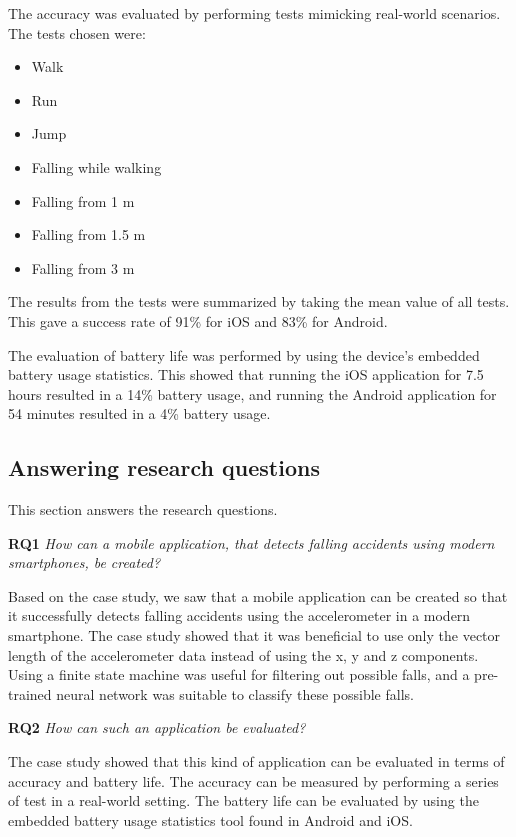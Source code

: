 \documentclass[12pt, a4paper, onecolumn]{article}
\begin{document}
	The accuracy was evaluated by performing tests mimicking real-world scenarios. The tests chosen were:
	
	\begin{itemize}
		\item Walk
		\item Run
		\item Jump
		\item Falling while walking
		\item Falling from 1 m
		\item Falling from 1.5 m
		\item Falling from 3 m
	\end{itemize}
	
	The results from the tests were summarized by taking the mean value of all tests. This gave a success rate of 91\% for iOS and 83\% for Android.
	
	The evaluation of battery life was performed by using the device's embedded battery usage statistics. This showed that running the iOS application for 7.5 hours resulted in a 14\% battery usage, and running the Android application for 54 minutes resulted in a 4\% battery usage.
	
	\subsection{Answering research questions}
	
	This section answers the research questions.
	
	\textbf{RQ1} \textit{How can a mobile application, that detects falling accidents using modern smartphones, be created?}
	
	Based on the case study, we saw that a mobile application can be created so that it successfully detects falling accidents using the accelerometer in a modern smartphone. The case study showed that it was beneficial to use only the vector length of the accelerometer data instead of using the x, y and z components. Using a finite state machine was useful for filtering out possible falls, and a pre-trained neural network was suitable to classify these possible falls.
	
	\textbf{RQ2} \textit{How can such an application be evaluated?}
	
	The case study showed that this kind of application can be evaluated in terms of accuracy and battery life. The accuracy can be measured by performing a series of test in a real-world setting. The battery life can be evaluated by using the embedded battery usage statistics tool found in Android and iOS.
	
\end{document}

